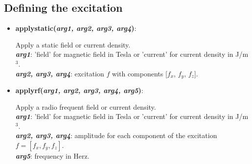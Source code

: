 \subsection{Defining the excitation}

\begin{itemize}

 \item {\textbf{applystatic(\textit{arg1, arg2, arg3, arg4})}:
				\flushright\parbox{0.9 \textwidth}{\vspace{-0.25cm} 
				Apply a static field or current density.\\
				\textbf{\textit{arg1}}: 'field' for magnetic field in Tesla or 'current' for current density in J/m$^3$.\\
				\textbf{\textit{arg2, arg3, arg4}}: excitation $f$ with components [$f_x$, $f_y$, $f_z$].
				}\flushleft}

 \item {\vspace{-0.4cm}\textbf{applyrf(\textit{arg1, arg2, arg3, arg4, arg5})}:
				\flushright\parbox{0.9 \textwidth}{\vspace{-0.25cm} 
				Apply a radio frequent field or current density.\\
				\textbf{\textit{arg1}}: 'field' for magnetic field in Tesla or 'current' for current density in J/m$^3$.\\
				\textbf{\textit{arg2, arg3, arg4}}: amplitude for each component of the excitation $f = [f_x, f_y, f_z]$.\\
				\textbf{\textit{arg5}}: frequency in Herz.
				}\flushleft}


\end{itemize}
